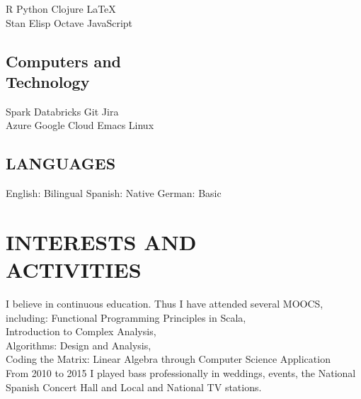 \documentclass[]{deedy-resume-openfont}
\begin{document}
\begin{minipage}[t]{0.33\textwidth}
R \textbullet{} Python \textbullet{} Clojure \textbullet{} \LaTeX\ \\ 
Stan \textbullet{} Elisp \textbullet{} Octave \textbullet{} JavaScript \\

\sectionsep

\subsection{Computers and \\  Technology}

Spark \textbullet{} Databricks \textbullet{} Git \textbullet{} Jira \\
Azure  \textbullet{} Google Cloud \textbullet{} Emacs \textbullet{} Linux \\

\sectionsep

\subsection{LANGUAGES}

English: Bilingual \textbullet{} Spanish: Native \textbullet{} German: Basic \\

\sectionsep

\section{INTERESTS AND \\ ACTIVITIES} 
I believe in continuous education. Thus I have attended several MOOCS, including:
Functional Programming Principles in Scala,\\
Introduction to Complex Analysis,\\
Algorithms: Design and Analysis,\\
Coding the Matrix: Linear Algebra through Computer Science Application \\
\sectionsep
From 2010 to 2015 I played bass professionally in weddings, events, the National Spanish Concert Hall and Local and National TV stations.
\sectionsep


%
%

\end{minipage} 
\hfill
\end{document}

